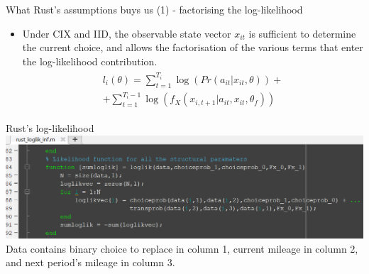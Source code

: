 \documentclass[aspectratio=169]{beamer}
\begin{document}
	
	
	\begin{frame}{What Rust's assumptions buys us (1) - factorising the log-likelihood}
		\begin{itemize}
			\itemsep1em 
			\item Under CIX and IID, the observable state vector $x_{it}$ is sufficient to determine the current choice, and allows the factorisation of the various terms that enter the log-likelihood contribution. 
			\begin{align} 
				\begin{split} \label{eq:loglik}
					l_i(\theta) = \sum_{t=1}^{T_i} \log(Pr(a_{it}|x_{it},\theta))+  \\
					+ \sum_{t=1}^{T_i - 1}\log(f_X(x_{i,t+1}|a_{it},x_{it},\theta_f))       
				\end{split}
			\end{align}
			
			
		\end{itemize}
	\end{frame}
	
	\begin{frame}{Rust's log-likelihood}
		\includegraphics[width=\textwidth]{figs/4_loglik.PNG}\\
		
		\vspace{0.5cm}
		Data contains binary choice to replace in column 1, current mileage in column 2, and next period's mileage in column 3.
	\end{frame}
	
\end{document}
